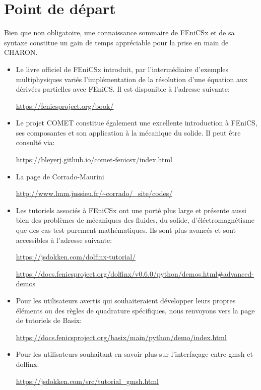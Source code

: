 \documentclass[10pt]{book}
\begin{document}
\section*{Point de départ}
Bien que non obligatoire, une connaissance sommaire de FEniCSx et de sa syntaxe constitue un gain de temps appréciable pour la prise en main de CHARON.
\begin{itemize}[label=$\star$]
\item Le livre officiel de FEniCSx introduit, par l'intermédiaire d'exemples multiphysiques variés l'implémentation de la résolution d'une équation aux dérivées partielles avec FEniCS. Il est disponible à l'adresse suivante:
\begin{center}
\url{https://fenicsproject.org/book/}
\end{center}
\item Le projet COMET constitue également une excellente introduction à FEniCS, ses composantes et son application à la mécanique du solide. Il peut être consulté via:
\begin{center}
\url{https://bleyerj.github.io/comet-fenicsx/index.html}
\end{center}
\item La page de Corrado-Maurini
\begin{center}
\url{http://www.lmm.jussieu.fr/~corrado/_site/codes/}
\end{center}
\item Les tutoriels associés à FEniCSx ont une porté plus large et présente aussi bien des problèmes de mécaniques des fluides, du solide, d'éléctromagnétisme que des cas test purement mathématiques. Ils sont plus avancés et sont accessibles à l'adresse suivante:
\begin{center}
\url{https://jsdokken.com/dolfinx-tutorial/}
\end{center}
\begin{center}
\url{https://docs.fenicsproject.org/dolfinx/v0.6.0/python/demos.html#advanced-demos}
\end{center}
\item Pour les utilisateurs avertis qui souhaiteraient développer leurs propres éléments ou des règles de quadrature spécifiques, nous renvoyons vers la page de tutoriels de Basix:
\begin{center}
\url{https://docs.fenicsproject.org/basix/main/python/demo/index.html}
\end{center}
\item Pour les utilisateurs souhaitant en savoir plus sur l’interfaçage entre gmsh et dolfinx:
\begin{center}
\url{https://jsdokken.com/src/tutorial_gmsh.html}
\end{center}
\end{itemize}
\end{document}
